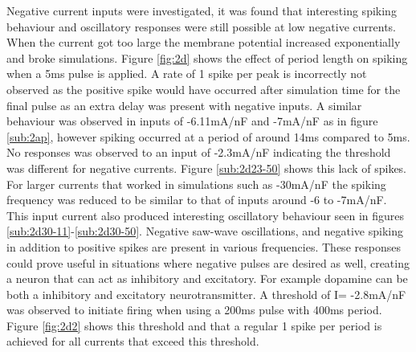 \documentclass[twoside,twocolumn]{article}
\begin{document}
Negative current inputs were investigated, it was found that interesting spiking behaviour and oscillatory responses were still possible at low negative currents. When the current got too large the membrane potential increased exponentially and broke simulations. Figure \ref{fig:2d} shows the effect of period length on spiking when a 5ms pulse is applied. A rate of 1 spike per peak is incorrectly not observed as the positive spike would have occurred after simulation time for the final pulse as an extra delay was present with negative inputs.
\newline
 A similar behaviour was observed in inputs of -6.11mA/nF and -7mA/nF as in figure \ref{sub:2ap}, however spiking occurred at a period of around 14ms compared to 5ms. No responses was observed to an input of -2.3mA/nF indicating the threshold was different for negative currents. Figure \ref{sub:2d23-50} shows this lack of spikes. For larger currents that worked in simulations such as -30mA/nF the spiking frequency was reduced to be similar to that of inputs around -6 to -7mA/nF. This input current also produced interesting oscillatory behaviour seen in figures \ref{sub:2d30-11}-\ref{sub:2d30-50}. Negative saw-wave oscillations, and negative spiking in addition to positive spikes are present in various frequencies. These responses could prove useful in situations where negative pulses are desired as well, creating a neuron that can act as inhibitory and excitatory. For example dopamine can be both a inhibitory and excitatory neurotransmitter.
\newline
A threshold of I= -2.8mA/nF was observed to initiate firing when using a 200ms pulse with 400ms period. Figure \ref{fig:2d2} shows this threshold and that a regular 1 spike per period is achieved for all currents that exceed this threshold.
\end{document}
